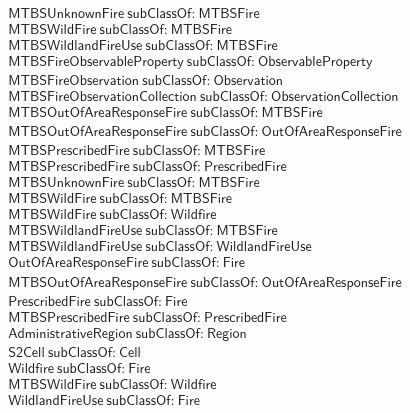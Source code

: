 \begin{align}
  \textsf{MTBSUnknownFire}~\textsf{subClassOf:}~\textsf{MTBSFire}\\
  \textsf{MTBSWildFire}~\textsf{subClassOf:}~\textsf{MTBSFire}\\
  \textsf{MTBSWildlandFireUse}~\textsf{subClassOf:}~\textsf{MTBSFire}\\
  \textsf{MTBSFireObservableProperty}~\textsf{subClassOf:}~\textsf{ObservableProperty}\\
  \textsf{MTBSFireObservation}~\textsf{subClassOf:}~\textsf{Observation}\\
  \textsf{MTBSFireObservationCollection}~\textsf{subClassOf:}~\textsf{ObservationCollection}\\
  \textsf{MTBSOutOfAreaResponseFire}~\textsf{subClassOf:}~\textsf{MTBSFire}\\
  \textsf{MTBSOutOfAreaResponseFire}~\textsf{subClassOf:}~\textsf{OutOfAreaResponseFire}\\
  \textsf{MTBSPrescribedFire}~\textsf{subClassOf:}~\textsf{MTBSFire}\\
  \textsf{MTBSPrescribedFire}~\textsf{subClassOf:}~\textsf{PrescribedFire}\\
  \textsf{MTBSUnknownFire}~\textsf{subClassOf:}~\textsf{MTBSFire}\\
  \textsf{MTBSWildFire}~\textsf{subClassOf:}~\textsf{MTBSFire}\\
  \textsf{MTBSWildFire}~\textsf{subClassOf:}~\textsf{Wildfire}\\
  \textsf{MTBSWildlandFireUse}~\textsf{subClassOf:}~\textsf{MTBSFire}\\
  \textsf{MTBSWildlandFireUse}~\textsf{subClassOf:}~\textsf{WildlandFireUse}\\
  \textsf{OutOfAreaResponseFire}~\textsf{subClassOf:}~\textsf{Fire}\\
  \textsf{MTBSOutOfAreaResponseFire}~\textsf{subClassOf:}~\textsf{OutOfAreaResponseFire}\\
  \textsf{PrescribedFire}~\textsf{subClassOf:}~\textsf{Fire}\\
  \textsf{MTBSPrescribedFire}~\textsf{subClassOf:}~\textsf{PrescribedFire}\\
  \textsf{AdministrativeRegion}~\textsf{subClassOf:}~\textsf{Region}\\
  \textsf{S2Cell}~\textsf{subClassOf:}~\textsf{Cell}\\
  \textsf{Wildfire}~\textsf{subClassOf:}~\textsf{Fire}\\
  \textsf{MTBSWildFire}~\textsf{subClassOf:}~\textsf{Wildfire}\\
  \textsf{WildlandFireUse}~\textsf{subClassOf:}~\textsf{Fire}\\

\end{align}
